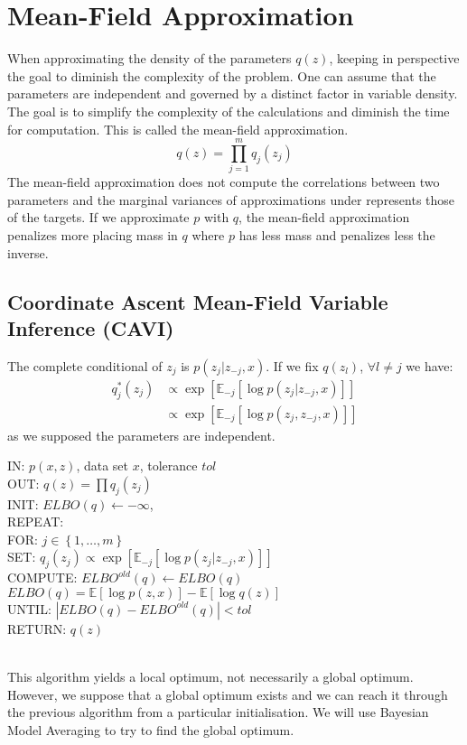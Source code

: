 \section{Mean-Field Approximation}
When approximating the density of the parameters $q(z)$, keeping in perspective the goal to diminish the complexity of the problem. One can assume that the parameters are independent and governed by a distinct factor in variable density. The goal is to simplify the complexity of the calculations and diminish the time for computation. This is called the mean-field approximation.
\begin{equation}
q(z) = \prod_{j=1}^m q_j(z_j)
\label{eq:meanField}
\end{equation}
The mean-field approximation does not compute the correlations between two parameters and the marginal variances of approximations under represents those of the targets. If we approximate $p$ with $q$, the mean-field approximation penalizes more placing mass in $q$ where $p$ has less mass and penalizes less the inverse.

\subsection{Coordinate Ascent Mean-Field Variable Inference (CAVI)}
The complete conditional of $z_j$ is $p(z_j|z_{-j},x)$. If we fix $q(z_l)$, $\forall l \neq j$ we have:
\begin{align}
q^*_j(z_j) &\propto \exp\left[\mathbb{E}_{-j}\left[\log p(z_j|z_{-j},x)\right]\right]\\
&\propto \exp\left[\mathbb{E}_{-j}\left[\log p(z_j,z_{-j},x)\right]\right]
\label{eq:CAVI}
\end{align}
as we supposed the parameters are independent.\\
\newline

\begin{text}
IN: $p(x,z)$, data set $x$, tolerance $tol$\\
OUT: $q(z) = \prod q_j(z_j)$\\
INIT: $ELBO(q) \leftarrow - \infty $, \\
REPEAT:\\
	FOR: $j \in \left\lbrace1, \dots, m\right\rbrace$\\
		SET: $q_j(z_j) \propto \exp\left[\mathbb{E}_{-j}\left[\log p(z_j|z_{-j},x)\right]\right]$\\
	COMPUTE: $ELBO^{old}(q) \leftarrow ELBO(q)$\\
		$ELBO(q) = \mathbb{E}\left[\log p(z,x)\right] - \mathbb{E}\left[\log q(z) \right] $\\
UNTIL: $|ELBO(q)-ELBO^{old}(q)|<tol$\\
RETURN: $q(z)$
\end{text}
\\
\newline
This algorithm yields a local optimum, not necessarily a global optimum. However, we suppose that a global optimum exists and we can reach it through the previous algorithm from a particular initialisation. We will use Bayesian Model Averaging to try to find the global optimum.